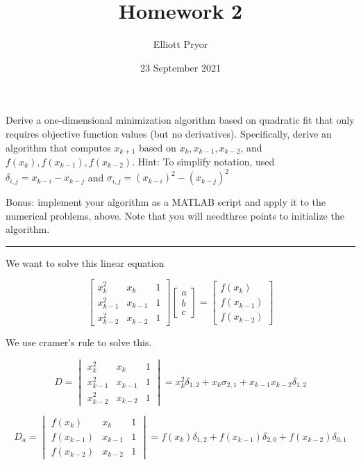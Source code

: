 \documentclass[11pt]{article}
\title{Homework 2}
\author{Elliott Pryor}
\date{23 September 2021}
\begin{document}
\maketitle



Derive a one-dimensional minimization algorithm based on quadratic fit that only requires objective function
values (but no derivatives). Specifically, derive an algorithm that computes $x_{k+1}$
based on $x_k,x_{k-1},x_{k-2}$, and $f(x_k),f(x_{k-1}),f(x_{k-2})$. 
Hint: To simplify notation, used
$\delta_{i,j} = x_{k-i} - x_{k-j}$ and $\sigma_{i,j} = (x_{k-i})^2 - (x_{k-j})^2$

Bonus: implement your algorithm as a MATLAB script and apply it to the numerical problems, above. 
Note that you will needthree points to initialize the algorithm.

\hrule

We want to solve this linear equation 

$$\begin{bmatrix}
    x_k^2 & x_k & 1 \\
    x_{k-1}^2 & x_{k-1} & 1 \\
    x_{k-2}^2 & x_{k-2} & 1
    \end{bmatrix}
    \begin{bmatrix}
        a \\
        b \\
        c
    \end{bmatrix}
    =
    \begin{bmatrix}
        f(x_k) \\
        f(x_{k-1}) \\
        f(x_{k-2})
    \end{bmatrix}
    $$

    We use cramer's rule to solve this.

$$D = \begin{vmatrix}
    x_k^2 & x_k & 1 \\
    x_{k-1}^2 & x_{k-1} & 1 \\
    x_{k-2}^2 & x_{k-2} & 1
    \end{vmatrix}
    = x_k^2 \delta_{1,2} + x_k \sigma_{2,1} + x_{k-1}x_{k-2} \delta_{1,2}
$$

$$D_a = \begin{vmatrix}
    f(x_k) & x_k & 1 \\
    f(x_{k-1}) & x_{k-1} & 1 \\
    f(x_{k-2}) & x_{k-2} & 1
    \end{vmatrix}
    = f(x_k)\delta_{1,2} + f(x_{k-1})\delta_{2,0} + f(x_{k-2})\delta_{0,1}
$$
\end{document}

